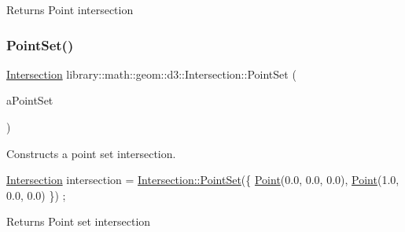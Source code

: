 \begin{DoxyReturn}{Returns}
Point intersection 
\end{DoxyReturn}
\mbox{\label{classlibrary_1_1math_1_1geom_1_1d3_1_1_intersection_a562d64d802f6fcd181f1122393642605}} 
\subsubsection{\texorpdfstring{Point\+Set()}{PointSet()}}
{\footnotesize\ttfamily \hyperlink{classlibrary_1_1math_1_1geom_1_1d3_1_1_intersection}{Intersection} library\+::math\+::geom\+::d3\+::\+Intersection\+::\+Point\+Set (\begin{DoxyParamCaption}\item[{const \hyperlink{classlibrary_1_1math_1_1geom_1_1d3_1_1objects_1_1_point_set}{objects\+::\+Point\+Set} \&}]{a\+Point\+Set }\end{DoxyParamCaption})\hspace{0.3cm}{\ttfamily [static]}}



Constructs a point set intersection. 


\begin{DoxyCode}
\hyperlink{classlibrary_1_1math_1_1geom_1_1d3_1_1_intersection_ab800dbab95076a1d7ae47bd9d0887da3}{Intersection} intersection = \hyperlink{classlibrary_1_1math_1_1geom_1_1d3_1_1_intersection_a562d64d802f6fcd181f1122393642605}{Intersection::PointSet}(\{ 
      \hyperlink{classlibrary_1_1math_1_1geom_1_1d3_1_1_intersection_a5155cc245bd2bf96a4296b0a8319c709}{Point}(0.0, 0.0, 0.0), \hyperlink{classlibrary_1_1math_1_1geom_1_1d3_1_1_intersection_a5155cc245bd2bf96a4296b0a8319c709}{Point}(1.0, 0.0, 0.0) \}) ;
\end{DoxyCode}


\begin{DoxyReturn}{Returns}
Point set intersection 
\end{DoxyReturn}
\mbox{\label{classlibrary_1_1math_1_1geom_1_1d3_1_1_intersection_a7294c6aa40d2353f1f4d7d6019c9dbdc}} 
